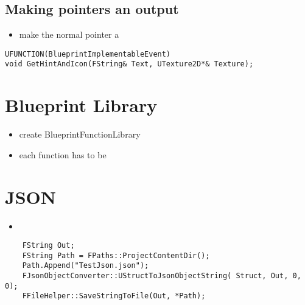         \subsection{Making pointers an output}
        \begin{itemize}
            \item make the normal pointer a 
        \end{itemize}
        \begin{lstlisting}
UFUNCTION(BlueprintImplementableEvent)
void GetHintAndIcon(FString& Text, UTexture2D*& Texture);
        \end{lstlisting}


    \section{Blueprint Library}
        \begin{itemize}
            \item create BlueprintFunctionLibrary
            \item each function has to be 
        \end{itemize}


    \section{JSON}
        \begin{itemize}
            \item 
        \end{itemize}
        \begin{lstlisting}
    FString Out;
	FString Path = FPaths::ProjectContentDir();
	Path.Append("TestJson.json");
	FJsonObjectConverter::UStructToJsonObjectString( Struct, Out, 0, 0);
	FFileHelper::SaveStringToFile(Out, *Path);
        \end{lstlisting}    

